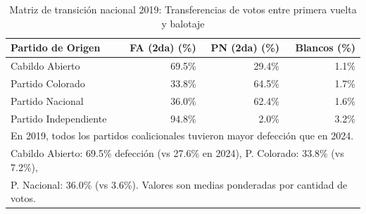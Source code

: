 \begin{table}[H]
\centering
\caption{Matriz de transición nacional 2019: Transferencias de votos entre primera vuelta y balotaje}
\label{tab:national_transitions_2019}
\begin{tabular}{lrrr}
\toprule
\textbf{Partido de Origen} & \textbf{FA (2da) (\%)} & \textbf{PN (2da) (\%)} & \textbf{Blancos (\%)} \\
\midrule
Cabildo Abierto & 69.5\% & 29.4\% & 1.1\% \\
Partido Colorado & 33.8\% & 64.5\% & 1.7\% \\
Partido Nacional & 36.0\% & 62.4\% & 1.6\% \\
Partido Independiente & 94.8\% & 2.0\% & 3.2\% \\
\bottomrule
\multicolumn{4}{l}{\footnotesize En 2019, todos los partidos coalicionales tuvieron mayor defección que en 2024.} \\
\multicolumn{4}{l}{\footnotesize Cabildo Abierto: 69.5\% defección (vs 27.6\% en 2024), P. Colorado: 33.8\% (vs 7.2\%),} \\
\multicolumn{4}{l}{\footnotesize P. Nacional: 36.0\% (vs 3.6\%). Valores son medias ponderadas por cantidad de votos.} \\
\end{tabular}
\end{table}

